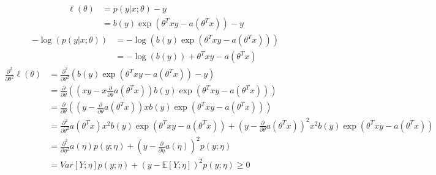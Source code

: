 \begin{answer}
\begin{align*}
\ell(\theta)&=p(y|x;\theta)-y\\
&=b(y)\exp(\theta^Txy-a(\theta^Tx))-y
\end{align*}
\begin{align*}
-\log\left(p(y|x;\theta)\right)&=-\log\left(b(y)\exp(\theta^Txy-a(\theta^Tx))\right)\\
&=-\log(b(y))+\theta^Txy-a(\theta^Tx)
\end{align*}
\begin{align*}
\frac{\partial^2}{\partial\theta^2}\ell(\theta)&=\frac{\partial^2}{\partial\theta^2}\left(b(y)\exp(\theta^Txy-a(\theta^Tx))-y\right)\\
&=\frac{\partial}{\partial\theta}\left(\left(xy-x\frac{\partial}{\partial\theta}a(\theta^Tx)\right)b(y)\exp(\theta^Txy-a(\theta^Tx))\right)\\
&=\frac{\partial}{\partial\theta}\left(\left(y-\frac{\partial}{\partial\theta}a(\theta^Tx)\right)xb(y)\exp(\theta^Txy-a(\theta^Tx))\right)\\
&=\frac{\partial^2}{\partial\theta^2}a(\theta^Tx)x^2b(y)\exp(\theta^Txy-a(\theta^Tx))+\left(y-\frac{\partial}{\partial\theta}a(\theta^Tx)\right)^2x^2b(y)\exp(\theta^Txy-a(\theta^Tx))\\
&=\frac{\partial^2}{\partial\eta^2}a(\eta)p(y;\eta)+\left(y-\frac{\partial}{\partial\eta}a(\eta)\right)^2p(y;\eta)\\
&=Var[Y; \eta]p(y;\eta)+\left(y-\mathbb{E}[Y; \eta]\right)^2p(y;\eta)\geq0
\end{align*}
\end{answer}
